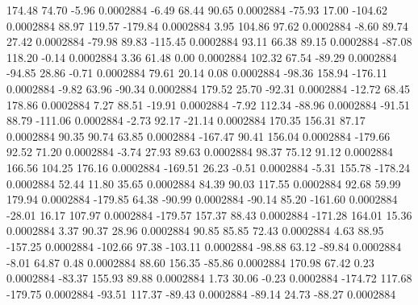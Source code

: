       174.48       74.70       -5.96     0.0002884
       -6.49       68.44       90.65     0.0002884
      -75.93       17.00     -104.62     0.0002884
       88.97      119.57     -179.84     0.0002884
        3.95      104.86       97.62     0.0002884
       -8.60       89.74       27.42     0.0002884
      -79.98       89.83     -115.45     0.0002884
       93.11       66.38       89.15     0.0002884
      -87.08      118.20       -0.14     0.0002884
        3.36       61.48        0.00     0.0002884
      102.32       67.54      -89.29     0.0002884
      -94.85       28.86       -0.71     0.0002884
       79.61       20.14        0.08     0.0002884
      -98.36      158.94     -176.11     0.0002884
       -9.82       63.96      -90.34     0.0002884
      179.52       25.70      -92.31     0.0002884
      -12.72       68.45      178.86     0.0002884
        7.27       88.51      -19.91     0.0002884
       -7.92      112.34      -88.96     0.0002884
      -91.51       88.79     -111.06     0.0002884
       -2.73       92.17      -21.14     0.0002884
      170.35      156.31       87.17     0.0002884
       90.35       90.74       63.85     0.0002884
     -167.47       90.41      156.04     0.0002884
     -179.66       92.52       71.20     0.0002884
       -3.74       27.93       89.63     0.0002884
       98.37       75.12       91.12     0.0002884
      166.56      104.25      176.16     0.0002884
     -169.51       26.23       -0.51     0.0002884
       -5.31      155.78     -178.24     0.0002884
       52.44       11.80       35.65     0.0002884
       84.39       90.03      117.55     0.0002884
       92.68       59.99      179.94     0.0002884
     -179.85       64.38      -90.99     0.0002884
      -90.14       85.20     -161.60     0.0002884
      -28.01       16.17      107.97     0.0002884
     -179.57      157.37       88.43     0.0002884
     -171.28      164.01       15.36     0.0002884
        3.37       90.37       28.96     0.0002884
       90.85       85.85       72.43     0.0002884
        4.63       88.95     -157.25     0.0002884
     -102.66       97.38     -103.11     0.0002884
      -98.88       63.12      -89.84     0.0002884
       -8.01       64.87        0.48     0.0002884
       88.60      156.35      -85.86     0.0002884
      170.98       67.42        0.23     0.0002884
      -83.37      155.93       89.88     0.0002884
        1.73       30.06       -0.23     0.0002884
     -174.72      117.68     -179.75     0.0002884
      -93.51      117.37      -89.43     0.0002884
      -89.14       24.73      -88.27     0.0002884
